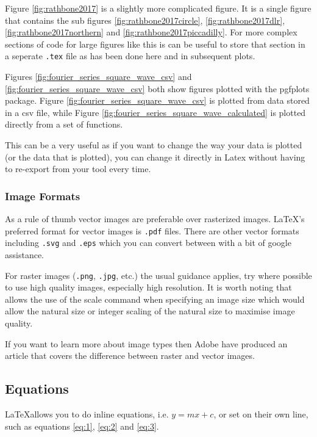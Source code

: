 Figure \ref{fig:rathbone2017} is a slightly more complicated figure. It is a single figure that contains the sub figures \ref{fig:rathbone2017circle}, \ref{fig:rathbone2017dlr}, \ref{fig:rathbone2017northern} and \ref{fig:rathbone2017piccadilly}. For more complex sections of code for large figures like this is can be useful to store that section in a seperate \verb|.tex| file as has been done here and in subsequent plots.





Figures \ref{fig:fourier_series_square_wave_csv} and \ref{fig:fourier_series_square_wave_csv} both show figures plotted with the pgfplots package. Figure \ref{fig:fourier_series_square_wave_csv} is plotted from data stored in a csv file, while Figure \ref{fig:fourier_series_square_wave_calculated} is plotted directly from a set of functions. 

This can be a very useful as if you want to change the way your data is plotted (or the data that is plotted), you can change it directly in Latex without having to re-export from your tool every time.

\subsubsection{Image Formats}
As a rule of thumb vector images are preferable over rasterized images. \LaTeX's preferred format for vector images is \verb|.pdf| files. There are other vector formats including \verb|.svg| and \verb|.eps| which you can convert between with a bit of google assistance.

For raster images (\verb|.png|, \verb|.jpg|, etc.) the usual guidance applies, try where possible to use high quality images, especially high resolution. It is worth noting that \Latex allows the use of the scale command when specifying an image size which would allow the natural size or integer scaling of the natural size to maximise image quality.

If you want to learn more about image types then Adobe have produced an article that covers the difference between raster and vector images\cite{adobe-raster-vector}.


\subsection{Equations}
\LaTeX allows you to do inline equations, i.e. $y=mx+c$, or set on their own line, such as equations \ref{eq:1}, \ref{eq:2} and \ref{eq:3}.

